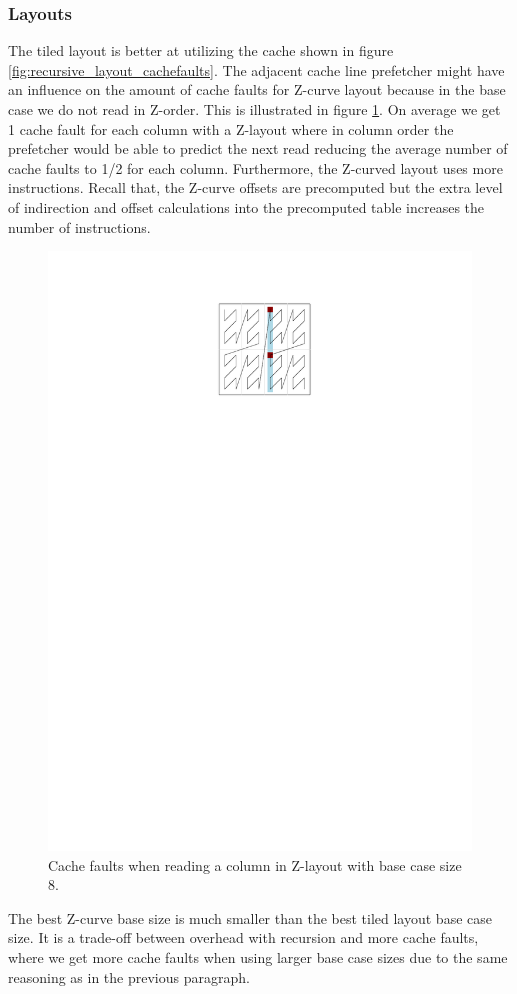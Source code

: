 \subsubsection{Layouts}

The tiled layout is better at utilizing the cache shown in figure \ref{fig:recursive_layout_cachefaults}. The adjacent cache line prefetcher might have an influence on the amount of cache faults for Z-curve layout because in the base case we do not read in Z-order. This is illustrated in figure \ref{fig:z-order}. On average we get 1 cache fault for each column with a Z-layout where in column order the prefetcher would be able to predict the next read reducing the average number of cache faults to 1/2 for each column. Furthermore, the Z-curved layout uses more instructions. Recall that, the Z-curve offsets are precomputed but the extra level of indirection and offset calculations into the precomputed table increases the number of instructions.

\begin{figure}[h!]
  \centering
  \includegraphics[width=.3\textwidth]{images/zlayout_cachefaults}
  \caption{Cache faults when reading a column in Z-layout with base case size 8.}
  \label{fig:z-order}
\end{figure}


The best Z-curve base size is much smaller than the best tiled layout base case size. It is a trade-off between overhead with recursion and more cache faults, where we get more cache faults when using larger base case sizes due to the same reasoning as in the previous paragraph.




